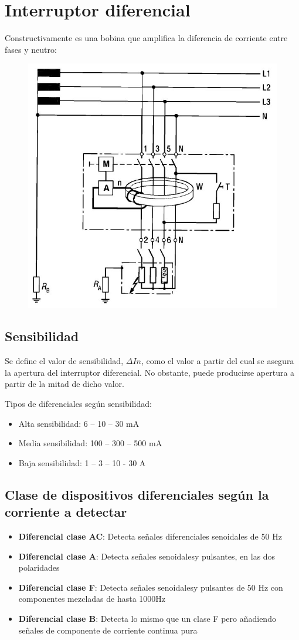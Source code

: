 \section{Interruptor diferencial}
Constructivamente es una bobina que amplifica la diferencia de corriente entre fases y neutro:
\begin{figure}[H]
	\centering
	\includegraphics[width=0.7\linewidth]{Images/27}
	\label{fig:27}
\end{figure}

\subsection{Sensibilidad}
Se define el valor de sensibilidad, $\Delta In$, como el valor a partir del cual se asegura la apertura del interruptor diferencial. No obstante, puede producirse apertura a partir de la mitad de dicho valor.
\newline

Tipos de diferenciales según sensibilidad:
\begin{itemize}
	\item Alta sensibilidad: 6 – 10 – 30 mA
	\item Media sensibilidad: 100 – 300 – 500 mA
	\item Baja sensibilidad: 1 – 3 – 10 - 30 A
\end{itemize}

\subsection{Clase de dispositivos diferenciales según la corriente a detectar}
\begin{itemize}
	\item \textbf{Diferencial clase AC}: Detecta señales diferenciales senoidales de 50 Hz
	\item \textbf{Diferencial clase A}: Detecta señales senoidalesy pulsantes, en las dos polaridades
	\item \textbf{Diferencial clase F}: Detecta señales senoidalesy pulsantes de 50 Hz con componentes mezcladas de hasta 1000Hz
	\item \textbf{Diferencial clase B}: Detecta lo mismo que un clase F pero añadiendo señales de componente de corriente continua pura
\end{itemize}

